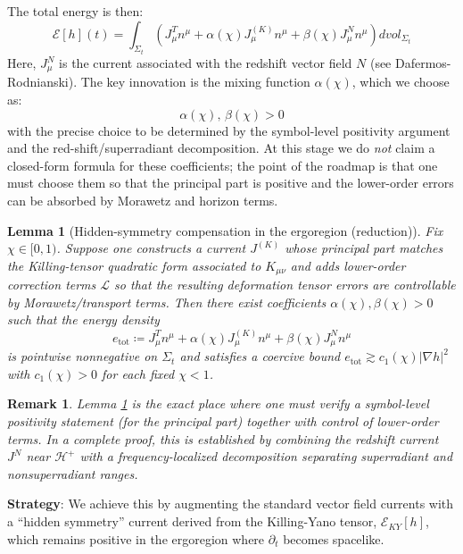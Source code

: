\documentclass[12pt,a4paper]{article}
\newtheorem{lemma}[theorem]{Lemma}
\newtheorem{remark}[theorem]{Remark}
\begin{document}
The total energy is then:
\begin{equation}
\mathcal{E}[h](t) = \int_{\Sigma_t} \left( J^T_\mu n^\mu + \alpha(\chi) J^{(K)}_\mu n^\mu + \beta(\chi) J^N_\mu n^\mu \right) dvol_{\Sigma_t}
\end{equation}
Here, $J^N_\mu$ is the current associated with the redshift vector field $N$ (see Dafermos-Rodnianski). The key innovation is the mixing function $\alpha(\chi)$, which we choose as:
\begin{equation}
\alpha(\chi),\,\beta(\chi) > 0
\end{equation}
with the precise choice to be determined by the symbol-level positivity argument and the red-shift/superradiant decomposition. At this stage we do \emph{not} claim a closed-form formula for these coefficients; the point of the roadmap is that one must choose them so that the principal part is positive and the lower-order errors can be absorbed by Morawetz and horizon terms.

\begin{lemma}[Hidden-symmetry compensation in the ergoregion (reduction)]\label{lem:ky-compensation}
Fix $\chi\in[0,1)$. Suppose one constructs a current $J^{(K)}$ whose principal part matches the Killing-tensor quadratic form associated to $K_{\mu\nu}$ and adds lower-order correction terms $\mathcal{L}$ so that the resulting deformation tensor errors are controllable by Morawetz/transport terms. Then there exist coefficients $\alpha(\chi),\beta(\chi)>0$ such that the energy density
\begin{equation}
e_{\mathrm{tot}}\coloneqq J^T_\mu n^\mu + \alpha(\chi) J^{(K)}_\mu n^\mu + \beta(\chi) J^N_\mu n^\mu
\end{equation}
is pointwise nonnegative on $\Sigma_t$ and satisfies a coercive bound $e_{\mathrm{tot}}\gtrsim c_1(\chi)|\nabla h|^2$ with $c_1(\chi)>0$ for each fixed $\chi<1$.
\end{lemma}

\begin{remark}
Lemma \ref{lem:ky-compensation} is the exact place where one must verify a symbol-level positivity statement (for the principal part) together with control of lower-order terms. In a complete proof, this is established by combining the redshift current $J^N$ near $\mathcal{H}^+$ with a frequency-localized decomposition separating superradiant and nonsuperradiant ranges.
\end{remark}

\textbf{Strategy}: We achieve this by augmenting the standard vector field currents with a ``hidden symmetry'' current derived from the Killing-Yano tensor, $\mathcal{E}_{KY}[h]$, which remains positive in the ergoregion where $\partial_t$ becomes spacelike.
\end{document}

